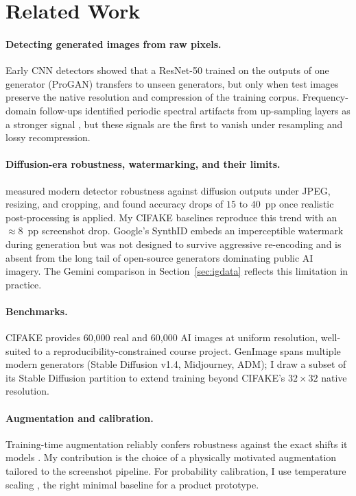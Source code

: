 \documentclass{article}
\begin{document}
\section{Related Work}
\label{sec:related}

\paragraph{Detecting generated images from raw pixels.}
Early CNN detectors \citep{wang2020cnngenerated} showed that a
ResNet-50 trained on the outputs of one generator (ProGAN)
transfers to unseen generators, but only when test images preserve
the native resolution and compression of the training corpus.
Frequency-domain follow-ups identified periodic spectral artifacts
from up-sampling layers as a stronger signal
\citep{zhang2019gan,frank2020frequency}, but these signals are the
first to vanish under resampling and lossy recompression.

\paragraph{Diffusion-era robustness, watermarking, and their limits.}
\citet{corvi2023diffusion} measured modern detector robustness
against diffusion outputs under JPEG, resizing, and cropping, and
found accuracy drops of $15$ to $40$~pp once realistic
post-processing is applied. My CIFAKE \citep{bird2024cifake}
baselines reproduce this trend with an $\approx 8$~pp screenshot
drop. Google's SynthID embeds an imperceptible watermark during
generation but was not designed to survive aggressive re-encoding
and is absent from the long tail of open-source generators
dominating public AI imagery. The Gemini comparison in
Section~\ref{sec:igdata} reflects this limitation in practice.

\paragraph{Benchmarks.}
CIFAKE \citep{bird2024cifake} provides 60{,}000 real and 60{,}000
AI images at uniform resolution, well-suited to a
reproducibility-constrained course project. GenImage
\citep{zhu2023genimage} spans multiple modern generators (Stable
Diffusion v1.4, Midjourney, ADM); I draw a subset of its Stable
Diffusion partition to extend training beyond CIFAKE's $32 \times
32$ native resolution.

\paragraph{Augmentation and calibration.}
Training-time augmentation reliably confers robustness against the
exact shifts it models
\citep{hendrycks2019augmix,geirhos2018imagenettexture}. My
contribution is the choice of a physically motivated augmentation
tailored to the screenshot pipeline. For probability calibration, I
use temperature scaling \citep{guo2017calibration}, the right
minimal baseline for a product prototype.
\end{document}
